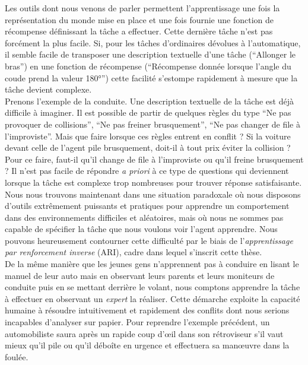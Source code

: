 \documentclass[11pt]{article}
\begin{document}
  Les outils dont nous venons de parler permettent l'apprentissage une fois la représentation du monde mise en place et une fois fournie une fonction de récompense définissant la tâche a effectuer. Cette dernière tâche n'est pas forcément la plus facile. Si, pour les tâches d'ordinaires dévolues à l'automatique, il semble facile de transposer une description textuelle d'une tâche (``Allonger le bras'') en une fonction de récompense (``Récompense donnée lorsque l'angle du coude prend la valeur 180°'') cette facilité s'estompe rapidement à mesure que la tâche devient complexe.\\

  Prenons l'exemple de la conduite. Une description textuelle de la tâche est déjà difficile à imaginer. Il est possible de partir de quelques règles du type ``Ne pas provoquer de collisions'', ``Ne pas freiner brusquement'', ``Ne pas changer de file à l'improviste''. Mais que faire lorsque ces règles entrent en conflit ? Si la voiture devant celle de l'agent pile brusquement, doit-il à tout prix éviter la collision ? Pour ce faire, faut-il qu'il change de file à l'improviste ou qu'il freine brusquement ? Il n'est pas facile de répondre \emph{a priori} à ce type de questions qui deviennent lorsque la tâche est complexe trop nombreuses pour trouver réponse satisfaisante.\\

  Nous nous trouvons maintenant dans une situation paradoxale où nous disposons d'outils extrêmement puissants et pratiques pour apprendre un comportement dans des environnements difficiles et aléatoires, mais où nous ne sommes pas capable de spécifier la tâche que nous voulons voir l'agent apprendre. Nous pouvons heureusement contourner cette difficulté par le biais de l'\emph{apprentissage par renforcement inverse} (ARI), cadre dans lequel s'inscrit cette thèse.\\

  De la même manière que les jeunes gens n'apprennent pas à conduire en lisant le manuel de leur auto mais en observant leurs parents et leurs moniteurs de conduite puis en se mettant derrière le volant, nous comptons apprendre la tâche à effectuer en observant un \emph{expert} la réaliser. Cette démarche exploite la capacité humaine à résoudre intuitivement et rapidement des conflits dont nous serions incapables d'analyser sur papier. Pour reprendre l'exemple précédent, un automobiliste saura après un rapide coup d'œil dans son rétroviseur s'il vaut mieux qu'il pile ou qu'il déboîte en urgence et effectuera sa manœuvre dans la foulée.\\
\end{document}
